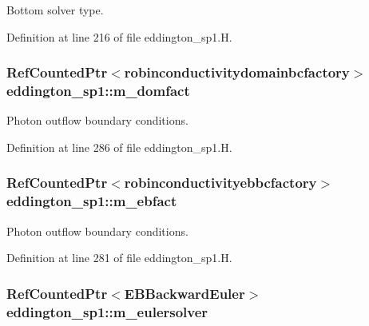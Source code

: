 Bottom solver type. 



Definition at line 216 of file eddington\+\_\+sp1.\+H.

\subsubsection[{\texorpdfstring{m\+\_\+domfact}{m_domfact}}]{\setlength{\rightskip}{0pt plus 5cm}Ref\+Counted\+Ptr$<${\bf robinconductivitydomainbcfactory}$>$ eddington\+\_\+sp1\+::m\+\_\+domfact\hspace{0.3cm}{\ttfamily [protected]}}\hypertarget{classeddington__sp1_a898b7acb563e655a43514256dd6a2cce}{}\label{classeddington__sp1_a898b7acb563e655a43514256dd6a2cce}


Photon outflow boundary conditions. 



Definition at line 286 of file eddington\+\_\+sp1.\+H.

\subsubsection[{\texorpdfstring{m\+\_\+ebfact}{m_ebfact}}]{\setlength{\rightskip}{0pt plus 5cm}Ref\+Counted\+Ptr$<${\bf robinconductivityebbcfactory}$>$ eddington\+\_\+sp1\+::m\+\_\+ebfact\hspace{0.3cm}{\ttfamily [protected]}}\hypertarget{classeddington__sp1_aec9daf4f816814f77eed4f38b5756bd2}{}\label{classeddington__sp1_aec9daf4f816814f77eed4f38b5756bd2}


Photon outflow boundary conditions. 



Definition at line 281 of file eddington\+\_\+sp1.\+H.

\subsubsection[{\texorpdfstring{m\+\_\+eulersolver}{m_eulersolver}}]{\setlength{\rightskip}{0pt plus 5cm}Ref\+Counted\+Ptr$<$E\+B\+Backward\+Euler$>$ eddington\+\_\+sp1\+::m\+\_\+eulersolver\hspace{0.3cm}{\ttfamily [protected]}}\hypertarget{classeddington__sp1_a89b8777e4b8d9e86368e5bb9b39823b7}{}\label{classeddington__sp1_a89b8777e4b8d9e86368e5bb9b39823b7}



